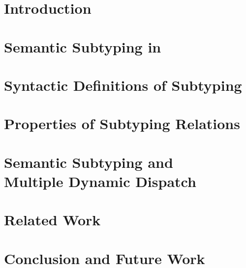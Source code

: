 \documentclass[sigplan,review]{acmart}\settopmatter{printfolios=true,printccs=false,printacmref=false}
\begin{document}
\section{Introduction}\label{sec:intro}




\section{Semantic Subtyping in \BetaJulia}\label{sec:semsub}




\section{Syntactic Definitions of Subtyping}\label{sec:synsub}






\section{Properties of Subtyping Relations}\label{sec:proofs}




\section{Semantic Subtyping and\\ Multiple Dynamic Dispatch}
\label{sec:discussion}




\section{Related Work}




\section{Conclusion and Future Work}





\newpage




\clearpage

\appendix


\end{document}
